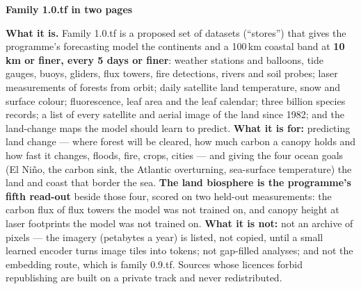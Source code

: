 \documentclass[10pt]{article}
\begin{document}
{\LARGE\bfseries Family 1.0.tf in two pages\par}
\vspace{2pt}{\large the land and its coasts, measured finer than 10\,km and 5 days\par}
\vspace{2pt}{\small blauewelt/earth --- two-page summary of the design note, 20 September 2026. A glossary of every term follows the two pages.\par}
\vspace{4pt}

\textbf{What it is.} Family 1.0.tf is a proposed set of datasets (``stores'') that gives the programme's
forecasting model the continents and a 100\,km coastal band at \textbf{10\,km or finer, every 5 days or finer}:
weather stations and balloons, tide gauges, buoys, gliders, flux towers, fire detections, rivers and soil
probes; laser measurements of forests from orbit; daily satellite land temperature, snow and surface colour;
fluorescence, leaf area and the leaf calendar; three billion species records; a
list of every satellite and aerial image of the land since 1982; and the land-change maps the model should learn
to predict. \textbf{What it is for:} predicting land change --- where forest will be cleared, how much carbon a
canopy holds and how fast it changes, floods, fire, crops, cities --- and giving the four ocean goals (El Ni\~no,
the carbon sink, the Atlantic overturning, sea-surface temperature) the land and coast that border the sea.
\textbf{The land biosphere is the programme's fifth read-out} beside those four, scored on two held-out
measurements: the carbon flux of flux towers the model was not trained on, and canopy height at laser footprints
the model was not trained on.
\textbf{What it is not:} not an archive of pixels --- the imagery (petabytes a year) is listed, not copied, until a
small learned encoder turns image tiles into tokens; not gap-filled analyses; and not the embedding route, which is
family 0.9.tf. Sources whose licences forbid republishing are built on a private track and never redistributed.
\end{document}
